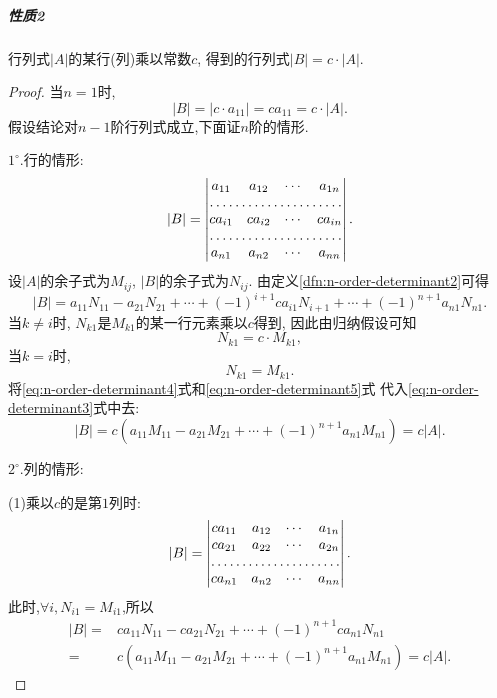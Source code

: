 \subparagraph{\color{ecolor}性质2}
行列式$|A|$的某行(列)乘以常数$c$,
得到的行列式$|B|=c\cdot|A|$.

\begin{proof}
  当$n=1$时,
  \[
    |B|=|c\cdot a_{11}|=ca_{11}=c\cdot |A|.
  \]
  假设结论对$n-1$阶行列式成立,下面证$n$阶的情形.

  $1^{\circ}.$行的情形:
  \[
    |B|=
    \begin{vmatrix}
      a_{11}&a_{12}&\cdots&a_{1n}\\
      \hdotsfor{4}\\
      ca_{i1}&ca_{i2}&\cdots&ca_{in}\\
      \hdotsfor{4}\\
      a_{n1}&a_{n2}&\cdots&a_{nn}
    \end{vmatrix}.
  \]
  设$|A|$的余子式为$M_{ij}$, $|B|$的余子式为$N_{ij}$.
  由定义\ref{dfn:n-order-determinant2}可得
  \begin{equation}\label{eq:n-order-determinant3}
    |B|=a_{11}N_{11}-a_{21}N_{21}+\cdots+
    (-1)^{i+1}ca_{i1}N_{i+1}+\cdots+(-1)^{n+1}a_{n1}N_{n1}.
  \end{equation}
  当$k\neq i$时, $N_{k1}$是$M_{k1}$的某一行元素乘以$c$得到,
  因此由归纳假设可知
  \begin{equation}\label{eq:n-order-determinant4}
    N_{k1}=c\cdot M_{k1},
  \end{equation}
  当$k=i$时,
  \begin{equation}\label{eq:n-order-determinant5}
    N_{k1}= M_{k1}.
  \end{equation}
  将\eqref{eq:n-order-determinant4}式和\eqref{eq:n-order-determinant5}式
  代入\eqref{eq:n-order-determinant3}式中去:
  \[
    |B|=c(a_{11}M_{11}-a_{21}M_{21}+\cdots+(-1)^{n+1}a_{n1}M_{n1})
    =c|A|.
  \]

  $2^{\circ}.$列的情形:

  (1)乘以$c$的是第$1$列时:
  \[
    |B|=
    \begin{vmatrix}
      ca_{11}&a_{12}&\cdots&a_{1n}\\
      ca_{21}&a_{22}&\cdots&a_{2n}\\
      \hdotsfor{4}\\
      ca_{n1}&a_{n2}&\cdots&a_{nn}
    \end{vmatrix}.
  \]
  此时,$\forall i, N_{i1}=M_{i1}$,所以
  \begin{align*}
    |B|= & ca_{11}N_{11}-ca_{21}N_{21}+\cdots+(-1)^{n+1}ca_{n1}N_{n1}\\
    = & c(a_{11}M_{11}-a_{21}M_{21}+\cdots+(-1)^{n+1}a_{n1}M_{n1})
    = c|A|.
  \end{align*}


\end{proof}
